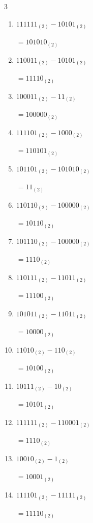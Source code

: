\begin{multicols}{3}
\begin{enumerate}
  \item $111111_{(2)} - 10101_{(2)}$

        $=101010_{(2)}$

  \item $110011_{(2)} - 10101_{(2)}$

        $=11110_{(2)}$

  \item $100011_{(2)} - 11_{(2)}$

        $=100000_{(2)}$

  \item $111101_{(2)} - 1000_{(2)}$

        $=110101_{(2)}$

  \item $101101_{(2)} - 101010_{(2)}$

        $=11_{(2)}$

  \item $110110_{(2)} - 100000_{(2)}$

        $=10110_{(2)}$

  \item $101110_{(2)} - 100000_{(2)}$

        $=1110_{(2)}$

  \item $110111_{(2)} - 11011_{(2)}$

        $=11100_{(2)}$

\columnbreak %

\resetques

  \item $101011_{(2)} - 11011_{(2)}$

        $=10000_{(2)}$

  \item $11010_{(2)} - 110_{(2)}$

        $=10100_{(2)}$

  \item $10111_{(2)} - 10_{(2)}$

        $=10101_{(2)}$

  \item $111111_{(2)} - 110001_{(2)}$

        $=1110_{(2)}$

  \item $10010_{(2)} - 1_{(2)}$

        $=10001_{(2)}$

  \item $111101_{(2)} - 11111_{(2)}$

        $=11110_{(2)}$


\end{enumerate}
\end{multicols}
